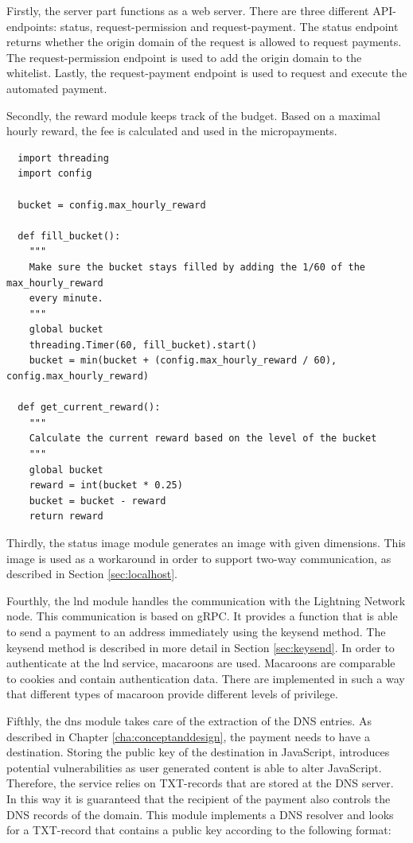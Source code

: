 Firstly, the server part functions as a web server. There are three different API-endpoints: status, request-permission and request-payment. The status endpoint returns whether the origin domain of the request is allowed to request payments. The request-permission endpoint is used to add the origin domain to the whitelist. Lastly, the request-payment endpoint is used to request and execute the automated payment.

Secondly, the reward module keeps track of the budget. Based on a maximal hourly reward, the fee is calculated and used in the micropayments.


\lstset{language=Python}
\lstset{frame=lines}
\lstset{basicstyle=\footnotesize}
\begin{lstlisting}
  import threading
  import config
  
  bucket = config.max_hourly_reward
  
  def fill_bucket():
    """
    Make sure the bucket stays filled by adding the 1/60 of the max_hourly_reward
    every minute.
    """
    global bucket
    threading.Timer(60, fill_bucket).start()
    bucket = min(bucket + (config.max_hourly_reward / 60), config.max_hourly_reward)
  
  def get_current_reward():
    """
    Calculate the current reward based on the level of the bucket
    """
    global bucket
    reward = int(bucket * 0.25)
    bucket = bucket - reward
    return reward
\end{lstlisting}

Thirdly, the status image module generates an image with given dimensions. This image is used as a workaround in order to support two-way communication, as described in Section \ref{sec:localhost}.

Fourthly, the lnd module handles the communication with the Lightning Network node. This communication is based on gRPC. It provides a function that is able to send a payment to an address immediately using the keysend method. The keysend method is described in more detail in Section \ref{sec:keysend}. In order to authenticate at the lnd service, macaroons are used. Macaroons are comparable to cookies and contain authentication data. There are implemented in such a way that different types of macaroon provide different levels of privilege. 

Fifthly, the dns module takes care of the extraction of the DNS entries. As described in Chapter \ref{cha:conceptanddesign}, the payment needs to have a destination. Storing the public key of the destination in JavaScript, introduces potential vulnerabilities as user generated content is able to alter JavaScript. Therefore, the service relies on TXT-records that are stored at the DNS server. In this way it is guaranteed that the recipient of the payment also controls the DNS records of the domain. This module implements a DNS resolver and looks for a TXT-record that contains a public key according to the following format:

